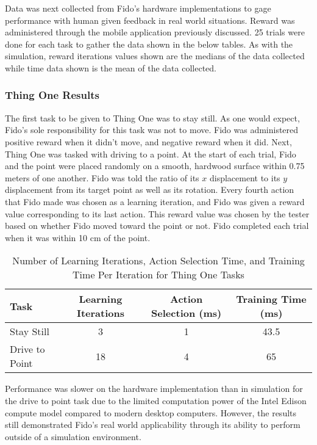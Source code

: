 Data was next collected from Fido's hardware implementations to gage performance with human given feedback in real world situations.
Reward was administered through the mobile application previously discussed.  25 trials were done for each task to gather the data shown in the below tables.  As with the simulation, reward iterations values shown are the medians of the data collected while time data shown is the mean of the data collected.

\subsubsection{Thing One Results}

The first task to be given to Thing One was to stay still.
As one would expect, Fido's sole responsibility for this task was not to move.
Fido was administered positive reward when it didn't move, and negative reward when it did.
Next, Thing One was tasked with driving to a point.
At the start of each trial, Fido and the point were placed randomly on a smooth, hardwood surface within 0.75 meters of one another.
Fido was told the ratio of its $x$ displacement to its $y$ displacement from its target point as well as its rotation.
Every fourth action that Fido made was chosen as a learning iteration, and Fido was given a reward value corresponding to its last action.
This reward value was chosen by the tester based on whether Fido moved toward the point or not.
Fido completed each trial when it was within 10 cm of the point.

\begin{table}[ht]
	\centering
	\begin{tabular}{@{}lccc@{}}
		\toprule
		Task             & Learning Iterations & Action Selection (ms) & Training Time (ms) \\ \midrule
		Stay Still       & 3                   & 1                    & 43.5                  \\
		Drive to Point   & 18                  & 4                     & 65                  \\
	\end{tabular}
	\caption{Number of Learning Iterations, Action Selection Time, and Training Time Per Iteration for Thing One Tasks}
	\label{tab:data2}
\end{table}

Performance was slower on the hardware implementation than in simulation for the drive to point task due to the limited computation power of the Intel Edison compute model compared to modern desktop computers.
However, the results still demonstrated Fido's real world applicability through its ability to perform outside of a simulation environment.

